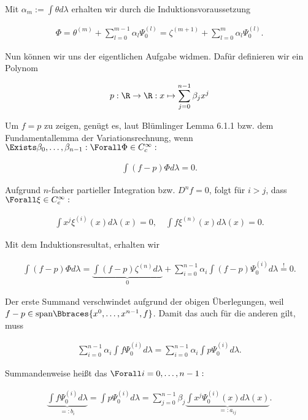 \begin{solution}
Mit $\alpha_m:=\int\theta d\lambda$ erhalten wir durch die Induktionsvoraussetzung

\begin{align*}
  \Phi
  = \theta^{(m)} +
    \sum_{l=0}^{m-1}
    \alpha_l \Psi_0^{(l)}
  = \zeta^{(m+1)} +
    \sum_{l=0}^{m}
    \alpha_l \Psi_0^{(l)}.
\end{align*}

Nun können wir uns der eigentlichen Aufgabe widmen. Dafür definieren wir ein Polynom

\begin{align*}
    p: \R \to \R: x \mapsto \sum_{j=0}^{n-1} \beta_j x^j
\end{align*}

Um $f = p$ zu zeigen, genügt es, laut Blümlinger Lemma 6.1.1 bzw. dem Fundamentallemma der Variationsrechnung, wenn $\Exists \beta_0, \dots, \beta_{n-1}: \Forall \Phi \in C_c^\infty:$

\begin{align*}
    \int (f-p) \Phi d \lambda = 0.
\end{align*}

Aufgrund $n$-facher partieller Integration bzw. $D^n f = 0$, folgt für $i>j$, dass $ \Forall \xi \in C_c^\infty:$

\begin{align*}
    \int x^j \xi^{(i)}(x) d \lambda(x) = 0, \quad
    \int f \xi^{(n)}(x) d \lambda(x) = 0.
\end{align*}

Mit dem Induktionsresultat, erhalten wir

\begin{align*}
  \int (f-p) \Phi d \lambda
  = \underbrace{\int (f-p) \zeta^{(n)} d \lambda}_0 +
    \sum_{i=0}^{n-1} \alpha_i
    \int(f-p) \Psi_0^{(i)} d \lambda
  \stackrel{!}{=} 0.
\end{align*}

Der erste Summand verschwindet aufgrund der obigen Überlegungen, weil $f-p \in \text{span} \Bbraces{x^0, \ldots, x^{n-1}, f}$. Damit das auch für die anderen gilt, muss

\begin{align*}
    \sum_{i=0}^{n-1} \alpha_i
    \int f \Psi_0^{(i)} d \lambda =
    \sum_{i=0}^{n-1}
    \alpha_i
    \int p \Psi_0^{(i)} d \lambda.
\end{align*}

Summandenweise heißt das $\Forall i = 0, \dots, n-1:$

\begin{align*}
    \underbrace{\int f \Psi_0^{(i)} d \lambda}_{=: b_i}
    = \int p \Psi_0^{(i)} d \lambda
    = \sum_{j=0}^{n-1}
      \beta_j
      \underbrace{\int x^j \Psi_0^{(i)}(x) d \lambda(x)}_{=: a_{ij}}.
\end{align*}


\end{solution}

